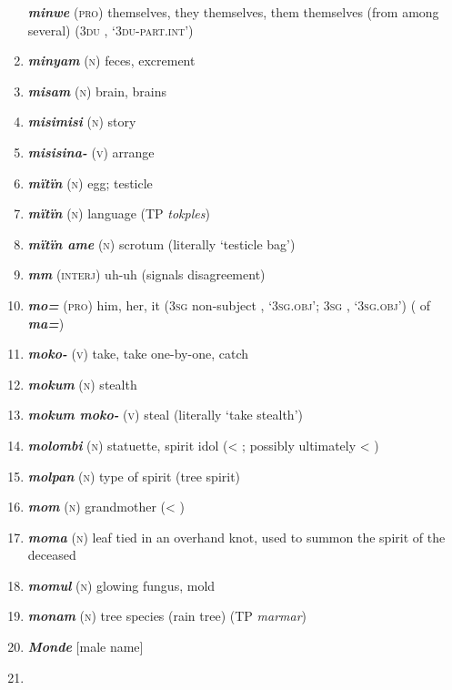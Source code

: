 \begin{enumerate}[noitemsep, label={}, align=left, widest=190, labelsep=1ex,leftmargin=*,itemindent=-10pt]
\textbf{\textit{minwe}} (\textsc{pro}) themselves, they themselves, them themselves (from among \linebreak several) (3\textsc{du} , ‘\textsc{3du-part.int}’) \item 
\textbf{\textit{minyam}} (\textsc{n}) feces, excrement \item 
\textbf{\textit{misam}} (\textsc{n}) brain, brains \item 
\textbf{\textit{misimisi}} (\textsc{n}) story \item 
\textbf{\textit{misisina-}} (\textsc{v}) arrange \item 
\textbf{\textit{mïtïn}} (\textsc{n}) egg; testicle \item 
\textbf{\textit{mïtïn}} (\textsc{n}) language (TP \textit{tokples}) \item 
\textbf{\textit{mïtïn ame}} (\textsc{n}) scrotum (literally ‘testicle bag’) \item 
\textbf{\textit{mm}} (\textsc{interj}) uh-uh (signals disagreement) \item 
\textbf{\textit{mo=}} (\textsc{pro}) him, her, it (3\textsc{sg} non-subject , ‘\textsc{3sg.obj}’; 3\textsc{sg} , ‘\textsc{3sg.obj}’) ( of \textbf{\textit{ma=}}) \item 
\textbf{\textit{moko-}} (\textsc{v}) take, take one-by-one, catch \item 
\textbf{\textit{mokum}} (\textsc{n}) stealth \item 
\textbf{\textit{mokum moko-}} (\textsc{v}) steal (literally ‘take stealth’) \item 
\textbf{\textit{molombi}} (\textsc{n}) statuette, spirit idol (< ; possibly ultimately < ) \item 
\textbf{\textit{molpan}} (\textsc{n}) type of spirit (tree spirit) \item 
\textbf{\textit{mom}} (\textsc{n}) grandmother (< ) \item 
\textbf{\textit{moma}} (\textsc{n}) leaf tied in an overhand knot, used to summon the spirit of the \linebreak deceased \item 
\textbf{\textit{momul}} (\textsc{n}) glowing fungus, mold \item 
\textbf{\textit{monam}} (\textsc{n}) tree species (rain tree) (TP \textit{marmar}) \item 
\textbf{\textit{Monde}} [male name] \item 

\end{enumerate}
